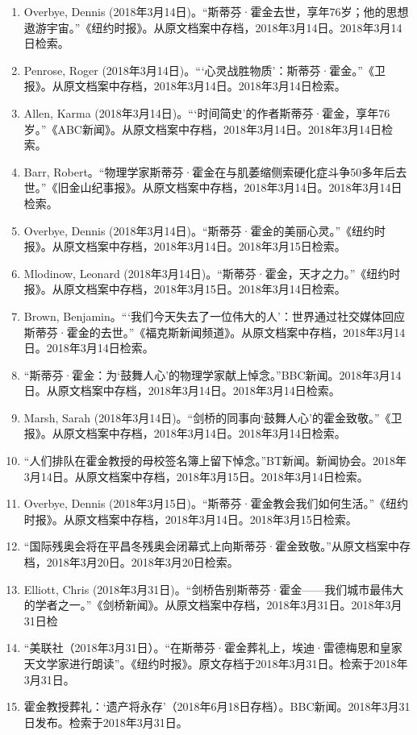\begin{enumerate}
\item Overbye, Dennis (2018年3月14日)。“斯蒂芬·霍金去世，享年76岁；他的思想遨游宇宙。”《纽约时报》。从原文档案中存档，2018年3月14日。2018年3月14日检索。  
\item Penrose, Roger (2018年3月14日)。“‘心灵战胜物质’：斯蒂芬·霍金。”《卫报》。从原文档案中存档，2018年3月14日。2018年3月14日检索。  
\item Allen, Karma (2018年3月14日)。“‘时间简史’的作者斯蒂芬·霍金，享年76岁。”《ABC新闻》。从原文档案中存档，2018年3月14日。2018年3月14日检索。  
\item Barr, Robert。“物理学家斯蒂芬·霍金在与肌萎缩侧索硬化症斗争50多年后去世。”《旧金山纪事报》。从原文档案中存档，2018年3月14日。2018年3月14日检索。  
\item Overbye, Dennis (2018年3月14日)。“斯蒂芬·霍金的美丽心灵。”《纽约时报》。从原文档案中存档，2018年3月14日。2018年3月15日检索。  
\item Mlodinow, Leonard (2018年3月14日)。“斯蒂芬·霍金，天才之力。”《纽约时报》。从原文档案中存档，2018年3月15日。2018年3月14日检索。  
\item Brown, Benjamin。“‘我们今天失去了一位伟大的人’：世界通过社交媒体回应斯蒂芬·霍金的去世。”《福克斯新闻频道》。从原文档案中存档，2018年3月14日。2018年3月14日检索。  
\item “斯蒂芬·霍金：为‘鼓舞人心’的物理学家献上悼念。”BBC新闻。2018年3月14日。从原文档案中存档，2018年3月14日。2018年3月14日检索。  
\item Marsh, Sarah (2018年3月14日)。“剑桥的同事向‘鼓舞人心’的霍金致敬。”《卫报》。从原文档案中存档，2018年3月14日。2018年3月14日检索。  
\item “人们排队在霍金教授的母校签名簿上留下悼念。”BT新闻。新闻协会。2018年3月14日。从原文档案中存档，2018年3月15日。2018年3月14日检索。  
\item Overbye, Dennis (2018年3月15日)。“斯蒂芬·霍金教会我们如何生活。”《纽约时报》。从原文档案中存档，2018年3月14日。2018年3月15日检索。  
\item “国际残奥会将在平昌冬残奥会闭幕式上向斯蒂芬·霍金致敬。”从原文档案中存档，2018年3月20日。2018年3月20日检索。  
\item Elliott, Chris (2018年3月31日)。“剑桥告别斯蒂芬·霍金——我们城市最伟大的学者之一。”《剑桥新闻》。从原文档案中存档，2018年3月31日。2018年3月31日检
\item “美联社（2018年3月31日）。“在斯蒂芬·霍金葬礼上，埃迪·雷德梅恩和皇家天文学家进行朗读”。《纽约时报》。原文存档于2018年3月31日。检索于2018年3月31日。
\item 霍金教授葬礼：‘遗产将永存’（2018年6月18日存档）。BBC新闻。2018年3月31日发布。检索于2018年3月31日。

\end{enumerate}
